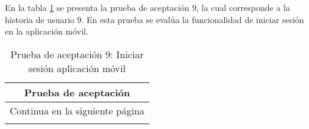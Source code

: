 En la tabla \ref{tab:prueba-9} se presenta la prueba de aceptación 9, la cual corresponde a la historia de usuario 9.
En esta prueba se evalúa la funcionalidad de iniciar sesión en la aplicación móvil.

\begin{longtable}{|p{6.7cm}|p{6.7cm}|}
    \caption{Prueba de aceptación 9: Iniciar sesión aplicación móvil} \label{tab:prueba-9}
    \\
    \hline
    \multicolumn{2}{|c|}{\textbf{Prueba de aceptación}}                                                                                                                                                                                                                                                                                               \\
    \hline

    \endfirsthead

    \hline
    \endhead

    \hline
    \multicolumn{2}{|c|}{{Continua en la siguiente página}}                                                                                                                                                                                                                                                                                           \\
    \hline
    \endfoot


\end{longtable}
